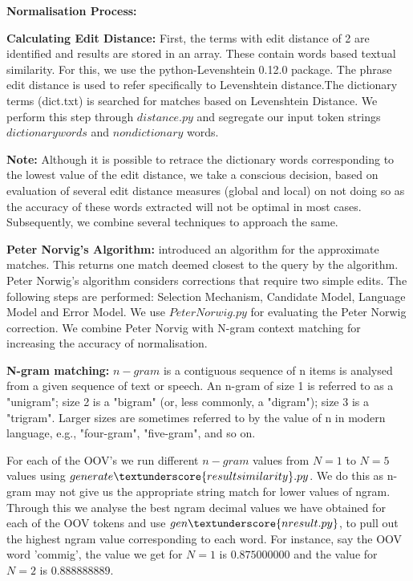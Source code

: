  \textbf{Normalisation Process:}
  
\textbf{Calculating Edit Distance:} First, the terms with edit distance of 2 are identified and results are stored in an array. These contain words based textual similarity. For this, we use the python-Levenshtein 0.12.0 package. The phrase edit distance is used 
  to refer specifically to Levenshtein distance.The dictionary terms (dict.txt) is searched for matches based on Levenshtein Distance. We perform this step through $distance.py$ and segregate our input token strings $dictionary words$ and $non dictionary$ words. 
  
 \textbf {Note:} Although it is possible to retrace the dictionary words corresponding to the lowest value of the edit distance, we take a conscious decision, based on evaluation of several edit distance measures (global and local) on not doing so as the accuracy of these words extracted will not be optimal in most cases. Subsequently, we combine several techniques to approach the same.
    
\textbf{Peter Norvig's Algorithm:} {\citet{pn15}} introduced an algorithm for the approximate matches. This returns one match deemed closest to the query by the algorithm. Peter Norwig's algorithm considers corrections that require two simple edits. The following steps are performed: Selection Mechanism, Candidate Model, Language Model and Error Model. We use $PeterNorwig.py$ for evaluating the Peter Norwig correction. We combine Peter Norvig with N-gram context matching for increasing the accuracy of normalisation.
  
\textbf{N-gram matching:} $n-gram$ is a contiguous sequence of n items is analysed from a given sequence of text or speech. An n-gram of size 1 is referred to as a "unigram"; size 2 is a "bigram" (or, less commonly, a "digram"); size 3 is a "trigram". Larger sizes are sometimes referred to by the value of n in modern language, e.g., "four-gram", "five-gram", and so on. 
   
   
For each of the OOV's we run different $n-gram$ values from $N=1$ to $N=5$ values using ${generate}\textunderscore{resultsimilarity}.py$. We do this as n-gram may not give us the appropriate string match for lower values of ngram. Through this we analyse the best  ngram decimal values we have obtained for each of the OOV tokens and use ${gen}\textunderscore {nresult.py}$, to pull out the highest ngram value corresponding to each word. For instance, say the OOV word 'commig', the value we get for $N=1$ is $0.875000000$ and the value for $N=2$ is $0.888888889$.

